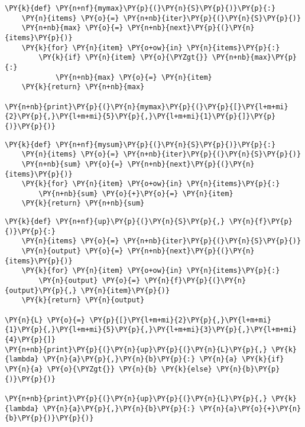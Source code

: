 \begin{Verbatim}[commandchars=\\\{\}]
\PY{k}{def} \PY{n+nf}{mymax}\PY{p}{(}\PY{n}{S}\PY{p}{)}\PY{p}{:}
    \PY{n}{items} \PY{o}{=} \PY{n+nb}{iter}\PY{p}{(}\PY{n}{S}\PY{p}{)}
    \PY{n+nb}{max} \PY{o}{=} \PY{n+nb}{next}\PY{p}{(}\PY{n}{items}\PY{p}{)}
    \PY{k}{for} \PY{n}{item} \PY{o+ow}{in} \PY{n}{items}\PY{p}{:}
        \PY{k}{if} \PY{n}{item} \PY{o}{\PYZgt{}} \PY{n+nb}{max}\PY{p}{:}
            \PY{n+nb}{max} \PY{o}{=} \PY{n}{item}
    \PY{k}{return} \PY{n+nb}{max}

\PY{n+nb}{print}\PY{p}{(}\PY{n}{mymax}\PY{p}{(}\PY{p}{[}\PY{l+m+mi}{2}\PY{p}{,}\PY{l+m+mi}{5}\PY{p}{,}\PY{l+m+mi}{1}\PY{p}{]}\PY{p}{)}\PY{p}{)}
\end{Verbatim}


\begin{Verbatim}[commandchars=\\\{\}]
\PY{k}{def} \PY{n+nf}{mysum}\PY{p}{(}\PY{n}{S}\PY{p}{)}\PY{p}{:}
    \PY{n}{items} \PY{o}{=} \PY{n+nb}{iter}\PY{p}{(}\PY{n}{S}\PY{p}{)}
    \PY{n+nb}{sum} \PY{o}{=} \PY{n+nb}{next}\PY{p}{(}\PY{n}{items}\PY{p}{)}
    \PY{k}{for} \PY{n}{item} \PY{o+ow}{in} \PY{n}{items}\PY{p}{:}
        \PY{n+nb}{sum} \PY{o}{+}\PY{o}{=} \PY{n}{item}
    \PY{k}{return} \PY{n+nb}{sum}
\end{Verbatim}


\begin{Verbatim}[commandchars=\\\{\}]
\PY{k}{def} \PY{n+nf}{up}\PY{p}{(}\PY{n}{S}\PY{p}{,} \PY{n}{f}\PY{p}{)}\PY{p}{:}
    \PY{n}{items} \PY{o}{=} \PY{n+nb}{iter}\PY{p}{(}\PY{n}{S}\PY{p}{)}
    \PY{n}{output} \PY{o}{=} \PY{n+nb}{next}\PY{p}{(}\PY{n}{items}\PY{p}{)}
    \PY{k}{for} \PY{n}{item} \PY{o+ow}{in} \PY{n}{items}\PY{p}{:}
        \PY{n}{output} \PY{o}{=} \PY{n}{f}\PY{p}{(}\PY{n}{output}\PY{p}{,} \PY{n}{item}\PY{p}{)}
    \PY{k}{return} \PY{n}{output}

\PY{n}{L} \PY{o}{=} \PY{p}{[}\PY{l+m+mi}{2}\PY{p}{,}\PY{l+m+mi}{1}\PY{p}{,}\PY{l+m+mi}{5}\PY{p}{,}\PY{l+m+mi}{3}\PY{p}{,}\PY{l+m+mi}{4}\PY{p}{]}
\PY{n+nb}{print}\PY{p}{(}\PY{n}{up}\PY{p}{(}\PY{n}{L}\PY{p}{,} \PY{k}{lambda} \PY{n}{a}\PY{p}{,}\PY{n}{b}\PY{p}{:} \PY{n}{a} \PY{k}{if} \PY{n}{a} \PY{o}{\PYZgt{}} \PY{n}{b} \PY{k}{else} \PY{n}{b}\PY{p}{)}\PY{p}{)}

\PY{n+nb}{print}\PY{p}{(}\PY{n}{up}\PY{p}{(}\PY{n}{L}\PY{p}{,} \PY{k}{lambda} \PY{n}{a}\PY{p}{,}\PY{n}{b}\PY{p}{:} \PY{n}{a}\PY{o}{+}\PY{n}{b}\PY{p}{)}\PY{p}{)}
\end{Verbatim}


